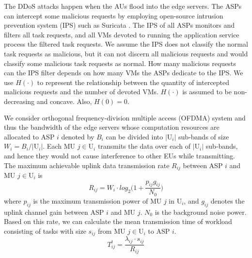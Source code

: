 \documentclass[conference]{IEEEtran}
\begin{document}
The DDoS attacks happen when the AUs flood into the edge servers. The ASPs can intercept some malicious requests by employing open-source intrusion prevention system (IPS) such as Suricata \cite{Suricata}. The IPS of all ASPs monitors and filters all task requests, and all VMs devoted to running the application service process the filtered task requests. We assume the IPS does not classify the normal task requests as malicious, but it can not discern all malicious requests and would classify some malicious task requests as normal. How many malicious requests can the IPS filter depends on how many VMs the ASPs dedicate to the IPS. We use $H(\cdot)$ to represent the relationship between the quantity of intercepted malicious requests and the number of devoted VMs. $H(\cdot)$ is assumed to be non-decreasing and concave. Also, $H(0)=0$.

We consider orthogonal frequency-division multiple access (OFDMA) system and thus the bandwidth of the edge servers whose computation resources are allocated to ASP $i$ denoted by $B_i$ can be divided into $|\mathrm{U}_i|$ sub-bands of size $W_{i} = B_i/|\mathrm{U}_i|$. Each MU $j\in \mathrm{U}_i$ transmits the data over each of $|\mathrm{U}_i|$ sub-bands, and hence they would not cause interference to other EUs while transmitting. The maximum achievable uplink data transmission rate $R_{ij}$ between ASP $i$ and MU $j \in \mathrm{U}_i$ is
\begin{equation} \label{eqn:shannon}
R_{ij}=W_i \cdot log_2\Big(1+\frac{p_{ij}g_{ij}}{N_{0}}\Big)
\end{equation}
where $p_{ij}$ is the maximum transmission power of MU $j$ in $\mathrm{U}_i$, and $g_{ij}$ denotes the uplink channel gain between ASP $i$ and MU $j$. $N_0$ is the background noise power. Based on this rate, we can calculate the mean transmission time of workload consisting of tasks with size $s_{ij}$ from MU $j \in \mathrm{U}_i$ to ASP $i$.
\begin{equation}
T_{ij}^t=\frac{\lambda_{ij} \cdot s_{ij}}{R_{ij}}
\end{equation}
\end{document}
